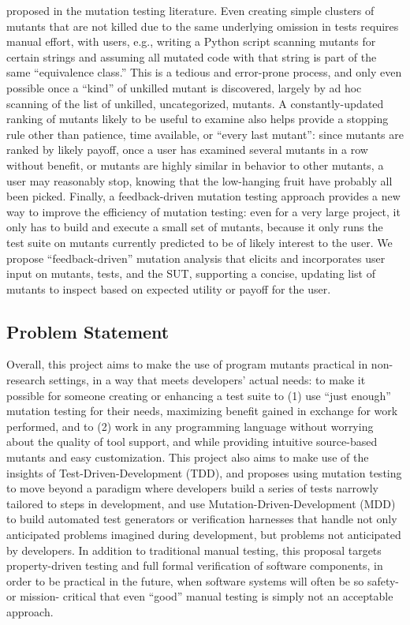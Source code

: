\begin{itemize}
proposed in the mutation testing literature.  
Even creating simple clusters of
mutants that are not killed due to the same underlying omission in tests
requires manual effort, with users, e.g., writing a Python script scanning
mutants for certain strings and assuming all mutated code with that string is
part of the same ``equivalence class.''  This is a tedious and error-prone
process, and only even possible once a ``kind'' of unkilled mutant is
discovered, largely by ad hoc scanning of the list of unkilled, uncategorized,
mutants.  
A constantly-updated ranking of mutants likely to be useful to examine
also helps provide a stopping rule other than patience, time available, or
``every last mutant'':  since mutants are ranked by likely payoff, once a user
has examined several mutants in a row without benefit, or mutants are highly
similar in behavior to other mutants, a user may reasonably stop, knowing that
the low-hanging fruit have probably all been picked.  Finally, a feedback-driven
mutation testing approach provides a new way to improve the efficiency of
mutation testing:  even for a very large project, it only has to build and
execute a small set of mutants, because it only runs the test suite on mutants
currently predicted to be of likely interest to the user.  
We propose ``feedback-driven'' mutation analysis that elicits and incorporates
user input on mutants, tests, and the SUT, supporting a concise, updating list
of mutants to inspect based on expected utility or payoff for the user.
\end{itemize}


\subsection{Problem Statement}

Overall, this project aims to make the use of program mutants practical in
non-research settings, in a way that meets developers' actual needs: to make it
possible for someone creating or enhancing a test suite to (1) use ``just
enough'' mutation testing for their needs, maximizing benefit gained in exchange
for work performed, and to (2) work in any programming language without worrying
about the quality of tool support, and while providing intuitive source-based
mutants and easy customization.  This project also aims to make use of the insights of
Test-Driven-Development (TDD), and proposes using mutation testing to move
beyond a paradigm where developers build a series of tests narrowly tailored to
steps in development, and use Mutation-Driven-Development (MDD) to build
automated test generators or verification harnesses that handle not only
anticipated problems imagined during development, but problems not anticipated
by developers.  In addition to traditional manual testing, this proposal targets
property-driven testing and full formal verification of software components, in
order to be practical in the future, when software systems will often be so
safety- or mission- critical that even ``good'' manual testing is simply not an
acceptable approach. 


